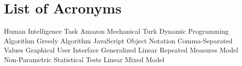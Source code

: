 \documentclass{thesisclass}
\begin{document}

\frontmatter
{}



\tableofcontents
\listoftables
\listoffigures
\chapter*{List of Acronyms}
\begin{acronym} [JSON]
  {Human Intelligence Task}
  {Amazon Mechanical Turk}
  {Dynamic Programming Algorithm}
  {Greedy Algorithm}
  {JavaScript Object Notation}
  {Comma-Separated Values}
  {Graphical User Interface}
  {Generalized Linear Repeated Measures Model}
  {Non-Parametric Statistical Tests}
  {Linear Mixed Model}
\end{acronym}


\mainmatter
{}












\cleardoublepage
{}
{}

{}	%
{}	%

												  


\end{document}
